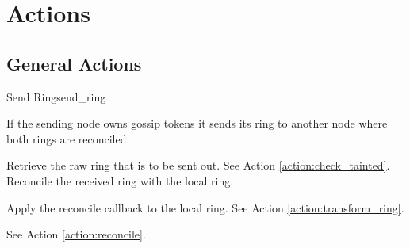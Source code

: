 \chapter{Actions}

\section{General Actions}
\begin{actionbox}{Send Ring}{send_ring}
	\begin{action}
		 If the sending node owns gossip tokens it sends its ring to another node where both rings are reconciled.
		\begin{action}
			 Retrieve the raw ring that is to be sent out.
			 See Action \ref{action:check_tainted}.
			 Reconcile the received ring with the local ring.
			\begin{action}
				 Apply the reconcile callback to the local ring. See Action \ref{action:transform_ring}.
				\begin{action}
					 See Action \ref{action:reconcile}.
				\end{action}
			\end{action}
		\end{action}
	\end{action}
\end{actionbox}

